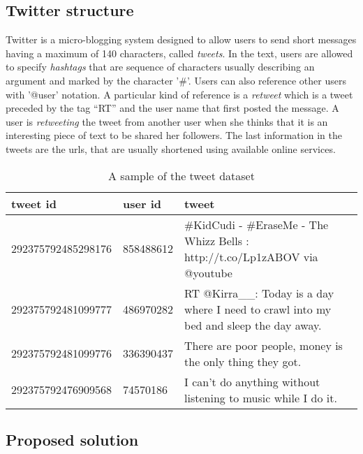 \subsection{Twitter structure}
Twitter is a micro-blogging system designed to allow users to send short messages having a maximum of 140 characters, called \textit{tweets}. 
In the text, users are allowed to specify \textit{hashtags} that are sequence of characters usually describing an argument and marked by the character '\#'. 
Users can also reference other users with '@user' notation. 
A particular kind of reference is a \textit{retweet} which is a tweet preceded by the tag ``RT'' and the user name that first posted the message. 
A user is \emph{retweeting} the tweet from another user when she thinks that it is an interesting piece of text to be shared her followers.
The last information in the tweets are the urls, that are usually shortened using available online services. 

\begin{table*}[!Ht]
\begin{tabular}{|l|l|l|}
\hline
tweet id & user id & tweet\\
\hline
292375792485298176&858488612& \#KidCudi - \#EraseMe - The Whizz Bells : http://t.co/Lp1zABOV via @youtube\\
292375792481099777&486970282& RT @Kirra\_\_: Today is a day where I need to crawl into my bed and sleep the day away.\\
292375792481099776&336390437& There are poor people, money is the only thing they got.\\
292375792476909568&74570186& I can't do anything without listening to music while I do it.\\
\hline
\end{tabular}
\caption{A sample of the tweet dataset}
\label{tbl:tweets}
\end{table*}


\subsection{Proposed solution}

